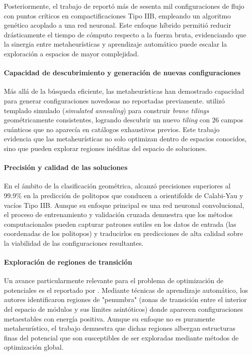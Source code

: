 Posteriormente, el trabajo de \textcite{Bizet_2020} reportó más de sesenta mil
configuraciones de flujo con puntos críticos en compactificaciones Tipo
IIB, empleando un algoritmo genético acoplado a una red neuronal. Este
enfoque híbrido permitió reducir drásticamente el tiempo de cómputo
respecto a la fuerza bruta, evidenciando que la sinergia entre
metaheurísticas y aprendizaje automático puede escalar la exploración
a espacios de mayor complejidad.

\paragraph{Capacidad de descubrimiento y generación de nuevas configuraciones}

Más allá de la búsqueda eficiente, las metaheurísticas han demostrado
capacidad para generar configuraciones novedosas no reportadas
previamente. \cite{He_2025} utilizó templado simulado
(\foreignlanguage{english}{\textit{simulated annealing}}) para construir
\foreignlanguage{english}{\textit{brane tilings}} geométricamente
consistentes, logrando descubrir un nuevo
\foreignlanguage{english}{\textit{tiling}} con 26 campos cuánticos que no
aparecía en catálogos exhaustivos previos. Este trabajo evidencia que las
metaheurísticas no solo optimizan dentro de espacios conocidos, sino que
pueden explorar regiones inéditas del espacio de soluciones.

\paragraph{Precisión y calidad de las soluciones}
 
En el ámbito de la clasificación geométrica, \cite{Gao_2022} alcanzó
precisiones superiores al 99.9\% en la predicción de politopos que
conducen a orientifolds de Calabi-Yau y vacíos Tipo IIB. Aunque su enfoque
principal es una red neuronal convolucional, el proceso de entrenamiento
y validación cruzada demuestra que los métodos computacionales pueden
capturar patrones sutiles en los datos de entrada (las coordenadas de los
politopos) y traducirlos en predicciones de alta calidad sobre la
viabilidad de las configuraciones resultantes.

\paragraph{Exploración de regiones de transición}

Un avance particularmente relevante para el problema de optimización de
potenciales es el reportado por \cite{Lanza_2025}. Mediante técnicas de
aprendizaje automático, los autores identificaron regiones de "penumbra"
(zonas de transición entre el interior del espacio de módulos y sus
límites asintóticos) donde aparecen configuraciones metaestables con
energía positiva. Aunque su enfoque no es puramente metaheurístico, el
trabajo demuestra que dichas regiones albergan estructuras finas del
potencial que son susceptibles de ser exploradas mediante métodos de
optimización global.

